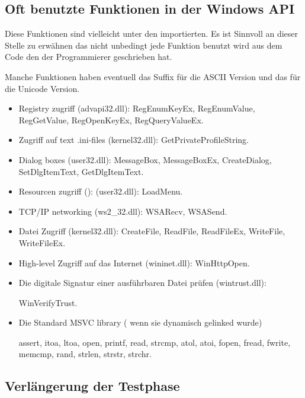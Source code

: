 \subsection{Oft benutzte Funktionen in der Windows API}

Diese Funktionen sind vielleicht unter den importierten.
Es ist Sinnvoll an dieser Stelle zu erwähnen das nicht unbedingt jede Funktion benutzt wird aus 
dem Code den der Programmierer geschrieben hat.

Manche Funktionen haben eventuell das  Suffix für die ASCII Version und das  für die Unicode Version.


\begin{itemize}

\item
Registry zugriff (advapi32.dll): 
RegEnumKeyEx, RegEnumValue, RegGetValue, RegOpenKeyEx, RegQueryValueEx.

\item
Zugriff auf text .ini-files (kernel32.dll): 
GetPrivateProfileString.

\item
Dialog boxes (user32.dll): 
MessageBox, MessageBoxEx, CreateDialog, SetDlgItemText, GetDlgItemText.

\item
Resourcen zugriff (): (user32.dll): LoadMenu.

\item
TCP/IP networking (ws2\_32.dll):
WSARecv, WSASend.

\item
Datei Zugriff (kernel32.dll):
CreateFile, ReadFile, ReadFileEx, WriteFile, WriteFileEx.

\item
High-level Zugriff auf das Internet (wininet.dll): WinHttpOpen.

\item
Die digitale Signatur einer ausführbaren Datei prüfen (wintrust.dll):

WinVerifyTrust.

\item
Die Standard MSVC library ( wenn sie dynamisch gelinked wurde) 

assert, itoa, ltoa, open, printf, read, strcmp, atol, atoi, fopen, fread, fwrite, memcmp, rand,
strlen, strstr, strchr.

\end{itemize}

\subsection{Verlängerung der Testphase}

